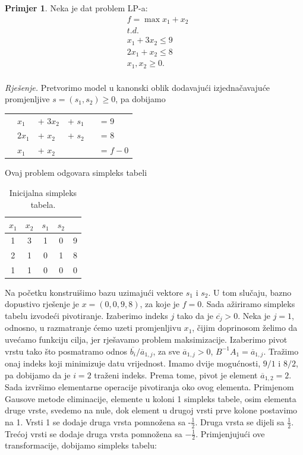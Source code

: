\documentclass[b5paper, utf8, 11pt, colorlinks]{book}
\theoremstyle{definition}
\newtheorem{primjer}{Primjer}[chapter]
\begin{document}
\begin{primjer}\label{primjer:simpl1} Neka je dat problem LP-a:
	\begin{align*}
		&f= \max x_1 + x_2  \nonumber \\
		& t.d. \\
		& x_1 + 3 x_2 \leq 9 \nonumber \\
		& 2x_1 + x_2 \leq 8  \nonumber \\
		& x_1, x_2 \geq 0. \nonumber \\
	\end{align*}
\end{primjer}
\emph{Rješenje.}
Pretvorimo model u kanonski oblik dodavajući izjednačavajuće promjenljive $s = (s_1, s_2)\geq 0$, pa dobijamo 
\begin{center}
	\begin{tabular}{llllll}
		\centering
		& $x_1$    & + $3x_2$  &+ $s_1$ & &= 9 \\
		& $2 x_1$ &   + $x_2$  & + $s_2$ & &= 8 \\
		& $x_1$   &   + $x_2$  &\  & &= $f - 0$ \\
	\end{tabular} 
\end{center}

Ovaj problem odgovara simpleks tabeli \\
\begin{table}[H]
	\centering
	\begin{tabular}{c c c c | c}
		$x_1$ & $x_2$ &  $s_1$ & $s_2$ & \\ \hline
		1 &  3  & 1 & 0 & 9 \\
		2 &  1  & 0 & 1 & 8 \\ \hline
		1 &  1  & 0  & 0 & 0 \\ \hline
	\end{tabular}
	\caption{Inicijalna simpleks tabela.}
	\label{tab:simpleks_tabela1}
\end{table} 

Na početku konstruišimo bazu uzimajući vektore $s_1$ i $s_2$. U tom slučaju, bazno dopustivo rješenje je $x = (0, 0, 9, 8)$, za koje je $f =0$. Sada ažiriramo simpleks tabelu izvodeći pivotiranje. Izaberimo indeks $j$ tako da je  $\overline{c_j}>0$. Neka je $j=1$, odnosno, u razmatranje ćemo uzeti promjenljivu $x_1$, čijim doprinosom želimo da uvećamo funkciju cilja, jer rješavamo problem maksimizacije. Izaberimo pivot vrstu tako što posmatramo odnos $\overline{b_i}/\overline{a}_{1,j}$, za sve $\overline{a}_{1,j} > 0$,  $B^{-1} A_1 = \overline{a}_{1,j}$. Tražimo onaj indeks koji minimizuje datu vrijednost. Imamo dvije mogućnosti, $9/1$ i $8/2$, pa dobijamo da je $i = 2$ traženi indeks. Prema tome, pivot je  element $\overline{a}_{1,2}=2$. Sada izvršimo elementarne operacije pivotiranja oko ovog elementa. Primjenom Gausove metode eliminacije, elemente u koloni 1 simpleks tabele, osim elementa druge vrste,  svedemo na nule, dok element u drugoj vrsti prve kolone postavimo na 1. Vrsti 1 se dodaje druga vrsta pomnožena sa -$\frac{1}{2}$. Druga vrsta se dijeli sa $\frac{1}{2}$. Trećoj vrsti se dodaje druga vrsta pomnožena sa $-\frac{1}{2}$. 
Primjenjujući ove transformacije, dobijamo simpleks tabelu:
\end{document}
